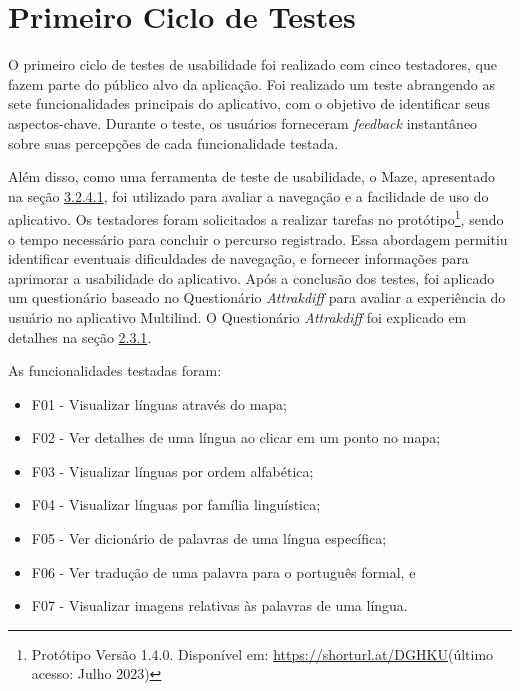 \section{Primeiro Ciclo de Testes}
\label{sec:Primeiro Ciclo}
O primeiro ciclo de testes de usabilidade foi realizado com cinco testadores, que fazem parte do público alvo da aplicação. Foi realizado um teste abrangendo as sete funcionalidades 
principais do aplicativo, com o objetivo de identificar seus aspectos-chave. Durante o teste, os usuários forneceram \textit{feedback} instantâneo sobre suas percepções de cada funcionalidade testada. 

Além disso, como uma ferramenta de teste de usabilidade, o Maze, apresentado na seção \hyperref[{sec:Maze}]{3.2.4.1}, foi utilizado para avaliar a navegação e a facilidade de uso do aplicativo. Os testadores foram solicitados a realizar  
tarefas no protótipo\footnote{Protótipo Versão 1.4.0. Disponível em: \url{https://shorturl.at/DGHKU}(último acesso: Julho 2023)},  sendo o tempo
necessário para concluir o percurso registrado. Essa abordagem permitiu identificar eventuais dificuldades de navegação, e fornecer informações para aprimorar a usabilidade do aplicativo. Após a conclusão dos 
testes, foi aplicado um questionário baseado no Questionário \textit{Attrakdiff} para avaliar a experiência do usuário no aplicativo Multilind. O Questionário \textit{Attrakdiff} foi explicado em detalhes na seção \hyperref[sec:Medicao2]{2.3.1}.

\begin{description}
    \item As funcionalidades testadas foram:
	\begin{itemize}
		\item F01 - Visualizar línguas através do mapa;
		\item F02 - Ver detalhes de uma língua ao clicar em um ponto no mapa;
		\item F03 - Visualizar línguas por ordem alfabética;
		\item F04 - Visualizar línguas por família linguística;
		\item F05 - Ver dicionário de palavras de uma língua específica;
		\item F06 - Ver tradução de uma palavra para o português formal, e
		\item F07 - Visualizar imagens relativas às palavras de uma língua.
	\end{itemize}
\end{description}

